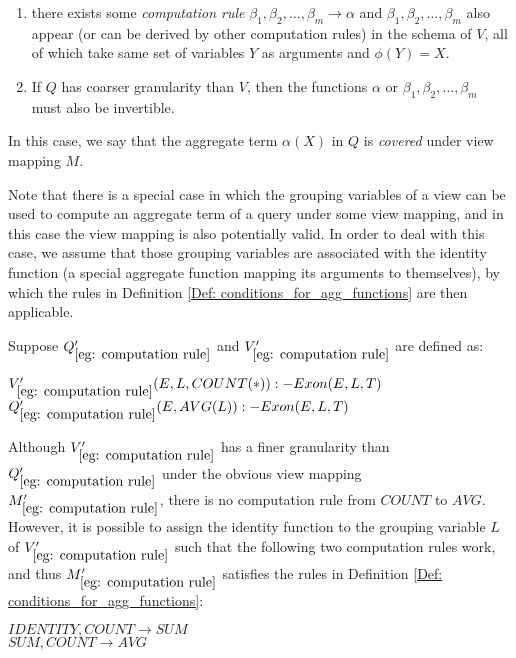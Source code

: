 \begin{definition}
\begin{enumerate}
\item there exists some {\em computation rule} $\beta_1, \beta_2, \dots, \beta_m \rightarrow \alpha$ and $\beta_1, \beta_2, \dots, \beta_m$ also appear (or can be derived by other computation rules) in the schema of $V$, all of which take same set of variables $Y$ as arguments and $\phi(Y) = X$.
\item If $Q$ has coarser granularity than $V$, then the functions $\alpha$ or $\beta_1, \beta_2, \dots, \beta_m$ must also be invertible.
\end{enumerate}
In this case, we say that the aggregate term $\alpha(X)$ in $Q$ is {\em covered} under view mapping $M$.
\end{definition}

Note that there is a special case in which the grouping variables of a view can be used to compute an aggregate term of a query under some view mapping, and in this case the view mapping is also potentially valid. In order to deal with this case, we assume that those grouping variables are associated with the  identity  function (a special aggregate function mapping its arguments to themselves), by which the rules in Definition \ref{Def: conditions_for_agg_functions} are then applicable.


\begin{example}\label{eg: computation rule}
Suppose $Q_{\ref{eg: computation rule}}'$ and $V_{\ref{eg: computation rule}}'$ are defined as:
\begin{tabbing}
$V_{\ref{eg: computation rule}}'(E, L, COUNT(*)) :- Exon(E, L, T)$\\
$Q_{\ref{eg: computation rule}}'(E, AVG(L)) :- Exon(E, L, T)$
\end{tabbing}

Although $V_{\ref{eg: computation rule}}'$ has a finer granularity than $Q_{\ref{eg: computation rule}}'$ under the obvious view mapping $M_{\ref{eg: computation rule}}'$, there is no computation rule from $COUNT$ to $AVG$. However, it is possible to assign the identity  function to the grouping variable $L$ of $V_{\ref{eg: computation rule}}'$ such that the following two computation rules work, and thus $M_{\ref{eg: computation rule}}'$ satisfies the rules in Definition \ref{Def: conditions_for_agg_functions}:

\begin{tabbing}
$IDENTITY, COUNT \rightarrow SUM$\\
$SUM, COUNT \rightarrow AVG$
\end{tabbing}

\end{example}

